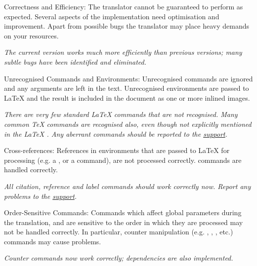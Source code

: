 \begin{htmllist}
\item [Correctness and Efficiency:\index{efficiency} ]
The translator cannot be guaranteed to perform as expected.
Several aspects of the implementation need
optimisation and improvement. Apart from possible bugs the translator
may place heavy demands on your resources.
\begin{changebar}
\textit
{The current version works much more efficiently than previous
versions; many subtle bugs have been identified and eliminated.}
\end{changebar}

\item [Unrecognised Commands and Environments:\index{unrecognised commands} ]
Unrecognised commands are ignored and any arguments are left in the text.
Unrecognised environments are passed to \LaTeX{}  and the result is
included in the document as one or more inlined images.
\begin{changebar}
\newline\textit
{There are very few standard \LaTeX{} commands that are not recognised.
Many common \TeX{} commands are recognised also,
even though not explicitly mentioned
in the \LaTeX{} .
Any aberrant commands should be reported to the \latextohtml{}
\hyperref{mailing list}{mailing list, see Section~}{}{support}.}
\end{changebar}


\item [Cross-references:\index{cross-references} ]
References in environments that are passed to \LaTeX{}  for processing
(e.g. a , or a  command),
are not processed correctly.
 commands are handled correctly.
\begin{changebar}
\newline\textit
{All citation, reference and label commands should work correctly now.
Report any problems to the \latextohtml{}
\hyperref{mailing list}{mailing list, see Section~}{}{support}.}
\end{changebar}

\item[Order-Sensitive Commands: ]
Commands which affect global parameters during the translation,
and are sensitive to the order in which they are processed may
not be handled correctly. In particular, counter manipulation
(e.g. , , , etc.)
commands may cause problems.
\begin{changebar}
\newline\textit
{Counter commands now work correctly; dependencies
are also implemented.}
\end{changebar}


\end{htmllist}

